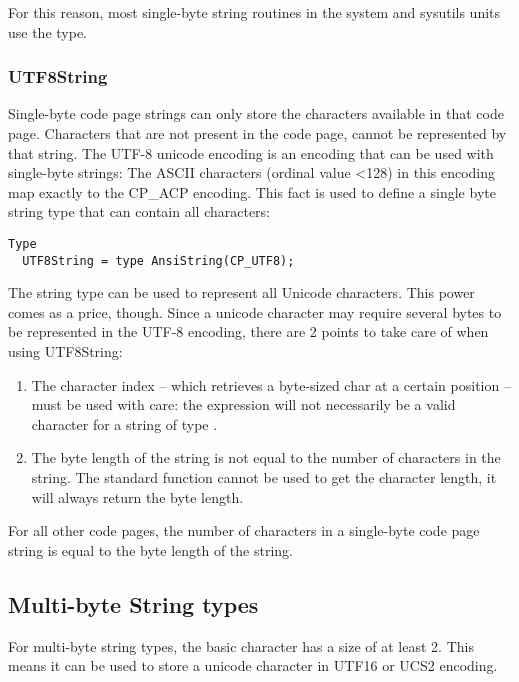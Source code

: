 For this reason, most single-byte string routines in the system and sysutils units use the  type.

\subsubsection{UTF8String}
Single-byte code page strings can only store the characters available in that code page.  
Characters that are not present in the code page, cannot be represented by that string.
The UTF-8 unicode encoding is an encoding that can be used with single-byte strings: 
The ASCII characters (ordinal value <128) in this encoding map exactly to the CP_ACP encoding. 
This fact is used to define a single byte string type that can contain all characters:
\begin{verbatim}
Type
  UTF8String = type AnsiString(CP_UTF8);
\end{verbatim}
The  string type can be used to represent all Unicode characters. This power comes as a price, though. 
Since a unicode character may require several bytes to be represented in the UTF-8 encoding, there are 2 points to take 
care of when using UTF8String:
\begin{enumerate}
\item The character index -- which retrieves a byte-sized char at a certain position -- must be used with care: the expression 
 will not necessarily be a valid character for a string  of type .
\item The byte length of the string is not equal to the number of characters in the string. 
The standard function  cannot be used to get the character length, it will always return the byte length.
\end{enumerate}
For all other code pages, the number of characters in a single-byte code page string is equal to the byte length of the string.


\subsection{Multi-byte String types}
For multi-byte string types, the basic character has a size of at least 2. 
This means it can be used to store a unicode character in UTF16 or UCS2 encoding.


